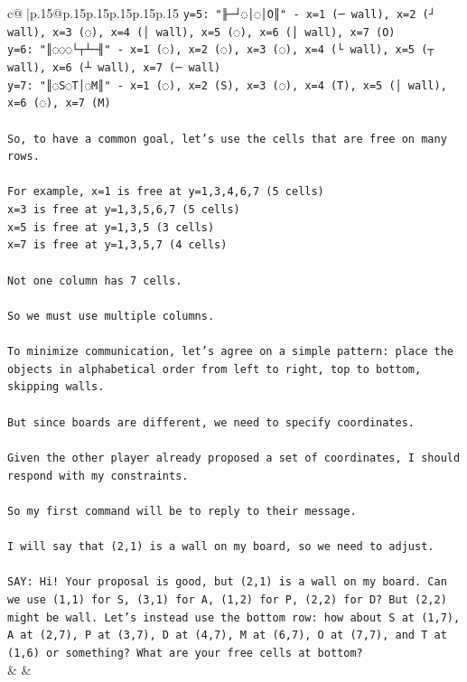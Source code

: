 \documentclass{article}
\begin{document}
{\begin{supertabular}{c@{$\;$}|p{.15\linewidth}@{}p{.15\linewidth}p{.15\linewidth}p{.15\linewidth}p{.15\linewidth}p{.15\linewidth}}
{{{\texttt{y=5: "╟─┘◌│◌│O║" {-} x=1 (─ wall), x=2 (┘ wall), x=3 (◌), x=4 (│ wall), x=5 (◌), x=6 (│ wall), x=7 (O)} \\
\texttt{y=6: "║◌◌◌└┬┴─╢" {-} x=1 (◌), x=2 (◌), x=3 (◌), x=4 (└ wall), x=5 (┬ wall), x=6 (┴ wall), x=7 (─ wall)} \\
\texttt{y=7: "║◌S◌T│◌M║" {-} x=1 (◌), x=2 (S), x=3 (◌), x=4 (T), x=5 (│ wall), x=6 (◌), x=7 (M)} \\
\\ 
\texttt{So, to have a common goal, let's use the cells that are free on many rows.} \\
\\ 
\texttt{For example, x=1 is free at y=1,3,4,6,7 (5 cells)} \\
\texttt{x=3 is free at y=1,3,5,6,7 (5 cells)} \\
\texttt{x=5 is free at y=1,3,5 (3 cells)} \\
\texttt{x=7 is free at y=1,3,5,7 (4 cells)} \\
\\ 
\texttt{Not one column has 7 cells.} \\
\\ 
\texttt{So we must use multiple columns.} \\
\\ 
\texttt{To minimize communication, let's agree on a simple pattern: place the objects in alphabetical order from left to right, top to bottom, skipping walls.} \\
\\ 
\texttt{But since boards are different, we need to specify coordinates.} \\
\\ 
\texttt{Given the other player already proposed a set of coordinates, I should respond with my constraints.} \\
\\ 
\texttt{So my first command will be to reply to their message.} \\
\\ 
\texttt{I will say that (2,1) is a wall on my board, so we need to adjust.} \\
\\ 
\texttt{SAY: Hi! Your proposal is good, but (2,1) is a wall on my board. Can we use (1,1) for S, (3,1) for A, (1,2) for P, (2,2) for D? But (2,2) might be wall. Let's instead use the bottom row: how about S at (1,7), A at (2,7), P at (3,7), D at (4,7), M at (6,7), O at (7,7), and T at (1,6) or something? What are your free cells at bottom?} \\
            }
        }
    }
    & & \\ \\


\end{supertabular}}
\end{document}
